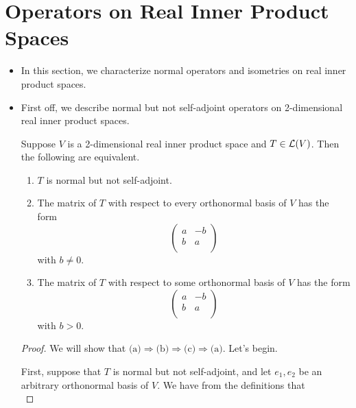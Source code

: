\documentclass[../main.tex]{subfiles}
\begin{document}
\section{Operators on Real Inner Product Spaces}
\begin{itemize}
    \item {}In this section, we characterize normal operators and isometries on real inner product spaces.
    \item First off, we describe normal but not self-adjoint operators on 2-dimensional real inner product spaces.
    \begin{theorem}\label{trm:normalNotSelfAdjoint}
        Suppose $V$ is a 2-dimensional real inner product space and $T\in\mathcal{L}(V)$. Then the following are equivalent.
        \begin{enumerate}[label={\textup{(}\alph*\textup{)}}]
            \item $T$ is normal but not self-adjoint.
            \item The matrix of $T$ with respect to every orthonormal basis of $V$ has the form
            \begin{equation*}
                \begin{pmatrix}
                    a & -b\\
                    b & a\\
                \end{pmatrix}
            \end{equation*}
            with $b\neq 0$.
            \item The matrix of $T$ with respect to some orthonormal basis of $V$ has the form
            \begin{equation*}
                \begin{pmatrix}
                    a & -b\\
                    b & a\\
                \end{pmatrix}
            \end{equation*}
            with $b>0$.
        \end{enumerate}
        \begin{proof}
            We will show that $\text{(a)}\Rightarrow\text{(b)}\Rightarrow\text{(c)}\Rightarrow\text{(a)}$. Let's begin.\par
            First, suppose that $T$ is normal but not self-adjoint, and let $e_1,e_2$ be an arbitrary orthonormal basis of $V$. We have from the definitions that
            \begin{equation*}

\end{equation*}
\end{proof}
\end{theorem}
\end{itemize}
\end{document}
